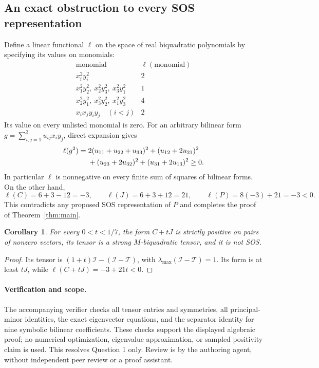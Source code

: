 \documentclass[11pt]{article}
\newtheorem{corollary}{Corollary}
\newcommand{\I}{\mathcal I}
\newcommand{\T}{\mathcal T}
\begin{document}
\subsection*{An exact obstruction to every SOS representation}
Define a linear functional $\ell$ on the space of real biquadratic
polynomials by specifying its values on monomials:
\[
\begin{array}{c|c}
\text{monomial}&\ell(\text{monomial})\\\hline
x_i^2y_i^2&2\\
x_1^2y_2^2,\ x_2^2y_3^2,\ x_3^2y_1^2&1\\
x_2^2y_1^2,\ x_3^2y_2^2,\ x_1^2y_3^2&4\\
x_ix_jy_iy_j\quad(i<j)&2
\end{array}
\]
Its value on every unlisted monomial is zero.
For an arbitrary bilinear form $g=\sum_{i,j=1}^3u_{ij}x_iy_j$,
direct expansion gives
\begin{align}
 \ell(g^2)={}&2(u_{11}+u_{22}+u_{33})^2
        +(u_{12}+2u_{21})^2\notag\\
       &+(u_{23}+2u_{32})^2+(u_{31}+2u_{13})^2\ge0.
       \label{eq:separator}
\end{align}
In particular $\ell$ is nonnegative on every finite sum of squares
of bilinear forms. On the other hand,
\[
 \ell(C)=6+3-12=-3,\qquad \ell(J)=6+3+12=21,
 \qquad \ell(P)=8(-3)+21=-3<0.
\]
This contradicts any proposed SOS representation of $P$ and completes
the proof of Theorem~\ref{thm:main}.

\begin{corollary}
For every $0<t<1/7$, the form $C+tJ$ is strictly positive on
pairs of nonzero vectors, its tensor is a strong $M$-biquadratic
tensor, and it is not SOS.
\end{corollary}
\begin{proof}
Its tensor is $(1+t)\I-(\I-\T)$, with
$\lambda_{\max}(\I-\T)=1$. Its form is at least $tJ$, while
$\ell(C+tJ)=-3+21t<0$.
\end{proof}

\paragraph{Verification and scope.}
The accompanying verifier checks all tensor entries and symmetries,
all principal-minor identities, the exact eigenvector equations,
and the separator identity for nine symbolic bilinear coefficients.
These checks support the displayed algebraic proof; no numerical
optimization, eigenvalue approximation, or sampled positivity claim
is used. This resolves Question 1 only. Review is by the authoring
agent, without independent peer review or a proof assistant.
\end{document}
